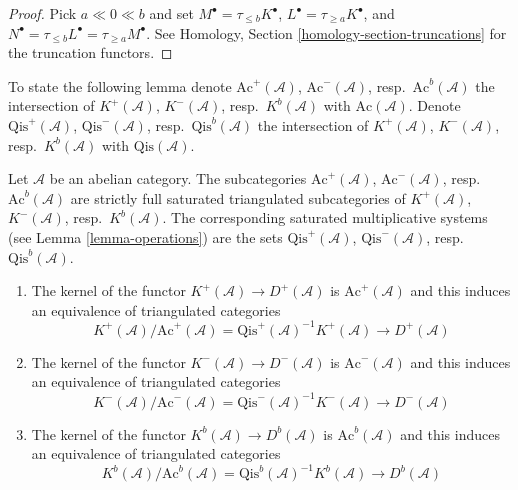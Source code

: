 \begin{proof}
Pick $a \ll 0 \ll b$ and set $M^\bullet = \tau_{\leq b}K^\bullet$,
$L^\bullet = \tau_{\geq a}K^\bullet$, and
$N^\bullet = \tau_{\leq b}L^\bullet = \tau_{\geq a}M^\bullet$.
See
Homology, Section \ref{homology-section-truncations}
for the truncation functors.
\end{proof}

\noindent
To state the following lemma denote
$\text{Ac}^{+}(\mathcal{A})$, $\text{Ac}^{-}(\mathcal{A})$,
resp.\ $\text{Ac}^b(\mathcal{A})$ the intersection of
$K^{+}(\mathcal{A})$, $K^{-}(\mathcal{A})$, resp.\ $K^b(\mathcal{A})$
with $\text{Ac}(\mathcal{A})$.
Denote $\text{Qis}^{+}(\mathcal{A})$, $\text{Qis}^{-}(\mathcal{A})$,
resp.\ $\text{Qis}^b(\mathcal{A})$ the intersection of
$K^{+}(\mathcal{A})$, $K^{-}(\mathcal{A})$, resp.\ $K^b(\mathcal{A})$
with $\text{Qis}(\mathcal{A})$.

\begin{lemma}
\label{lemma-bounded-derived}
Let $\mathcal{A}$ be an abelian category. The subcategories
$\text{Ac}^{+}(\mathcal{A})$, $\text{Ac}^{-}(\mathcal{A})$,
resp.\ $\text{Ac}^b(\mathcal{A})$
are strictly full saturated triangulated subcategories
of $K^{+}(\mathcal{A})$, $K^{-}(\mathcal{A})$, resp.\ $K^b(\mathcal{A})$.
The corresponding saturated multiplicative systems (see
Lemma \ref{lemma-operations})
are the sets $\text{Qis}^{+}(\mathcal{A})$, $\text{Qis}^{-}(\mathcal{A})$,
resp.\ $\text{Qis}^b(\mathcal{A})$.
\begin{enumerate}
\item The kernel of the functor $K^{+}(\mathcal{A}) \to D^{+}(\mathcal{A})$
is $\text{Ac}^{+}(\mathcal{A})$ and this induces an equivalence
of triangulated categories
$$
K^{+}(\mathcal{A})/\text{Ac}^{+}(\mathcal{A}) =
\text{Qis}^{+}(\mathcal{A})^{-1}K^{+}(\mathcal{A})
\longrightarrow
D^{+}(\mathcal{A})
$$
\item The kernel of the functor $K^{-}(\mathcal{A}) \to D^{-}(\mathcal{A})$
is $\text{Ac}^{-}(\mathcal{A})$ and this induces an equivalence
of triangulated categories
$$
K^{-}(\mathcal{A})/\text{Ac}^{-}(\mathcal{A}) =
\text{Qis}^{-}(\mathcal{A})^{-1}K^{-}(\mathcal{A})
\longrightarrow
D^{-}(\mathcal{A})
$$
\item The kernel of the functor $K^b(\mathcal{A}) \to D^b(\mathcal{A})$
is $\text{Ac}^b(\mathcal{A})$ and this induces an equivalence
of triangulated categories
$$
K^b(\mathcal{A})/\text{Ac}^b(\mathcal{A}) =
\text{Qis}^b(\mathcal{A})^{-1}K^b(\mathcal{A})
\longrightarrow
D^b(\mathcal{A})
$$
\end{enumerate}
\end{lemma}

